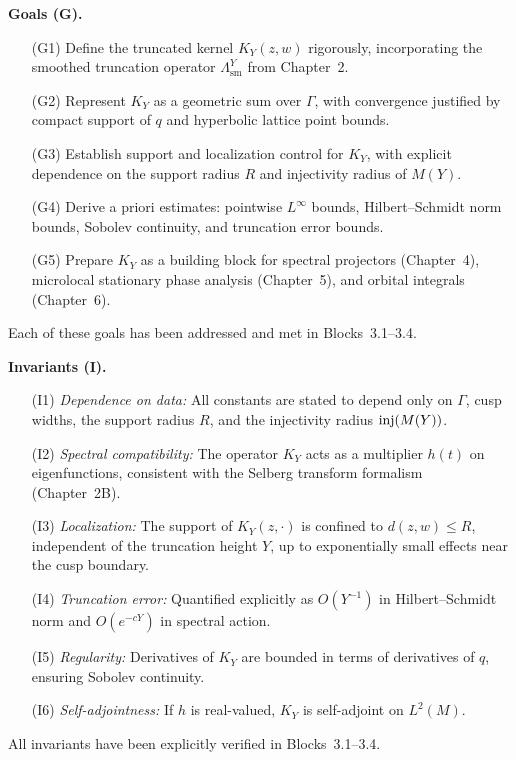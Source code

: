 \medskip

\noindent\textbf{Goals (G).}
\begin{itemize}
  \item[(G1)] Define the truncated kernel $K_{Y}(z,w)$ rigorously, incorporating the smoothed truncation operator $\Lambda^{Y}_{\mathrm{sm}}$ from Chapter~2.
  \item[(G2)] Represent $K_{Y}$ as a geometric sum over $\Gamma$, with convergence justified by compact support of $q$ and hyperbolic lattice point bounds.
  \item[(G3)] Establish support and localization control for $K_{Y}$, with explicit dependence on the support radius $R$ and injectivity radius of $M(Y)$.
  \item[(G4)] Derive a priori estimates: pointwise $L^{\infty}$ bounds, Hilbert–Schmidt norm bounds, Sobolev continuity, and truncation error bounds.
  \item[(G5)] Prepare $K_{Y}$ as a building block for spectral projectors (Chapter~4), microlocal stationary phase analysis (Chapter~5), and orbital integrals (Chapter~6).
\end{itemize}
Each of these goals has been addressed and met in Blocks~3.1–3.4.

\medskip

\noindent\textbf{Invariants (I).}
\begin{itemize}
  \item[(I1)] \emph{Dependence on data:} All constants are stated to depend only on $\Gamma$, cusp widths, the support radius $R$, and the injectivity radius $\operatorname{inj}(M(Y))$.
  \item[(I2)] \emph{Spectral compatibility:} The operator $K_{Y}$ acts as a multiplier $h(t)$ on eigenfunctions, consistent with the Selberg transform formalism (Chapter~2B).
  \item[(I3)] \emph{Localization:} The support of $K_{Y}(z,\cdot)$ is confined to $d(z,w)\le R$, independent of the truncation height $Y$, up to exponentially small effects near the cusp boundary.
  \item[(I4)] \emph{Truncation error:} Quantified explicitly as $O(Y^{-1})$ in Hilbert–Schmidt norm and $O(e^{-cY})$ in spectral action.
  \item[(I5)] \emph{Regularity:} Derivatives of $K_{Y}$ are bounded in terms of derivatives of $q$, ensuring Sobolev continuity.
  \item[(I6)] \emph{Self-adjointness:} If $h$ is real-valued, $K_{Y}$ is self-adjoint on $L^{2}(M)$.
\end{itemize}
All invariants have been explicitly verified in Blocks~3.1–3.4.

